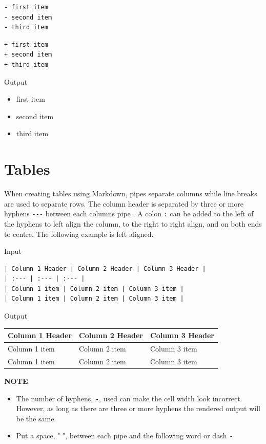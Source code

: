 \documentclass[
]{book}
\providecommand{\tightlist}{%
  \setlength{\itemsep}{0pt}\setlength{\parskip}{0pt}}
\begin{document}
\begin{verbatim}
- first item
- second item
- third item
\end{verbatim}

\begin{verbatim}
+ first item
+ second item
+ third item 
\end{verbatim}

Output

\begin{itemize}
\tightlist
\item
  first item
\item
  second item
\item
  third item
\end{itemize}

\hypertarget{tables-1}{%
\section{Tables}\label{tables-1}}

When creating tables using Markdown, pipes \texttt{\textbar{}} separate columns while line breaks are used to separate rows. The column header is separated by three or more hyphens \texttt{-\/-\/-} between each column\textquotesingle s pipe \texttt{\textbar{}}. A colon \texttt{:} can be added to the left of the hyphens to left align the column, to the right to right align, and on both ends to centre. The following example is left aligned.

Input

\begin{verbatim}
| Column 1 Header | Column 2 Header | Column 3 Header |
| :--- | :--- | :--- |
| Column 1 item | Column 2 item | Column 3 item |
| Column 1 item | Column 2 item | Column 3 item |
\end{verbatim}

Output

\begin{longtable}[]{@{}lll@{}}
\toprule()
Column 1 Header & Column 2 Header & Column 3 Header \\
\midrule()
\endhead
Column 1 item & Column 2 item & Column 3 item \\
Column 1 item & Column 2 item & Column 3 item \\
\bottomrule()
\end{longtable}

\textbf{NOTE}

\begin{itemize}
\tightlist
\item
  The number of hyphens, \texttt{-}, used can make the cell width look incorrect. However, as long as there are three or more hyphens the rendered output will be the same.
\item
  Put a space, " ", between each pipe \texttt{\textbar{}} and the following word or dash \texttt{-}
\end{itemize}
\end{document}
